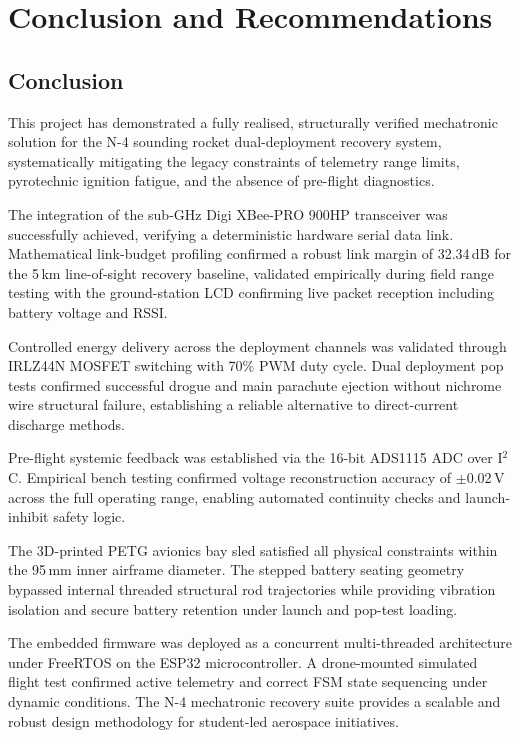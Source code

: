 \section{Conclusion and Recommendations}
\label{sec:conclusion}

\subsection{Conclusion}

This project has demonstrated a fully realised, structurally verified mechatronic
solution for the N-4 sounding rocket dual-deployment recovery system,
systematically mitigating the legacy constraints of telemetry range limits,
pyrotechnic ignition fatigue, and the absence of pre-flight diagnostics.

The integration of the sub-GHz Digi XBee-PRO 900HP transceiver was successfully
achieved, verifying a deterministic hardware serial data link. Mathematical
link-budget profiling confirmed a robust link margin of 32.34\,dB for the 5\,km
line-of-sight recovery baseline, validated empirically during field range testing
with the ground-station LCD confirming live packet reception including battery
voltage and RSSI.

Controlled energy delivery across the deployment channels was validated through
IRLZ44N MOSFET switching with 70\% PWM duty cycle. Dual deployment pop tests
confirmed successful drogue and main parachute ejection without nichrome wire
structural failure, establishing a reliable alternative to direct-current discharge
methods.

Pre-flight systemic feedback was established via the 16-bit ADS1115 ADC over I$^2$C.
Empirical bench testing confirmed voltage reconstruction accuracy of $\pm$0.02\,V
across the full operating range, enabling automated continuity checks and
launch-inhibit safety logic.

The 3D-printed PETG avionics bay sled satisfied all physical constraints within
the 95\,mm inner airframe diameter. The stepped battery seating geometry bypassed
internal threaded structural rod trajectories while providing vibration isolation
and secure battery retention under launch and pop-test loading.

The embedded firmware was deployed as a concurrent multi-threaded architecture
under FreeRTOS on the ESP32 microcontroller. A drone-mounted simulated flight
test confirmed active telemetry and correct FSM state sequencing under dynamic
conditions. The N-4 mechatronic recovery suite provides a scalable and robust
design methodology for student-led aerospace initiatives.

